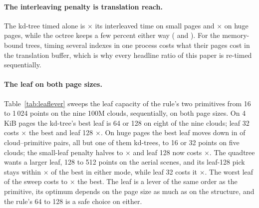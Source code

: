 \paragraph{The interleaving penalty is translation reach.} The kd-tree timed alone is \aloneOverInterleavedKdBase$\times$ its interleaved time on small pages and \aloneOverInterleavedKdHuge$\times$ on huge pages, while the octree keeps a few percent either way (\aloneOverInterleavedOtBase{} and \aloneOverInterleavedOtHuge). For the memory-bound trees, timing several indexes in one process costs what their pages cost in the translation buffer, which is why every headline ratio of this paper is re-timed sequentially.

\paragraph{The leaf on both page sizes.} Table~\ref{tab:leaflever} sweeps the leaf capacity of the rule's two primitives from 16 to 1\,024 points on the nine 100M clouds, sequentially, on both page sizes. On 4\,KiB pages the kd-tree's best leaf is 64 or 128 on eight of the nine clouds; leaf 32 costs \leafKdOverThirtyTwoBase$\times$ the best and leaf 128 \leafKdOverHundredTwentyEightBase$\times$. On huge pages the best leaf moves down in \leafShiftPairs{} of \leafPairs{} cloud--primitive pairs, all but one of them kd-trees, to 16 or 32 points on five clouds; the small-leaf penalty halves to \leafKdOverThirtyTwoHuge$\times$ and leaf 128 now costs \leafKdOverHundredTwentyEightHuge$\times$. The quadtree wants a larger leaf, 128 to 512 points on the aerial scenes, and its leaf-128 pick stays within \leafQtOverHundredTwentyEightBase$\times$ of the best in either mode, while leaf 32 costs it \leafQtOverThirtyTwoBase$\times$. The worst leaf of the sweep costs \leafWorstMin{} to \leafWorstMax$\times$ the best. The leaf is a lever of the same order as the primitive, its optimum depends on the page size as much as on the structure, and the rule's 64 to 128 is a safe choice on either.

\begin{table}[t]
\centering\footnotesize
\caption{The leaf capacity on nine 100M clouds, sequential protocol, 4\,KiB and 2\,MB pages: the best leaf per cloud (count of clouds), and the latency at leaf 32, at leaf 128 and at the worst leaf of the sweep over the latency at the best leaf, geometric mean (range).}
\label{tab:leaflever}

\end{table}

